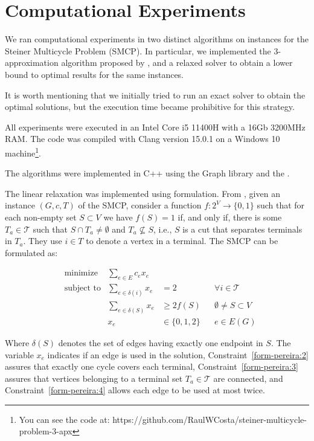 \chapter{Computational Experiments}
\label{chapter:experiments}

We ran computational experiments in two distinct algorithms on instances for the Steiner Multicycle Problem (SMCP). In particular, we implemented the \(3\)-approximation algorithm proposed by \cite{smcp_3apx}, and a relaxed solver to obtain a lower bound to optimal results for the same instances.

It is worth mentioning that we initially tried to run an exact solver to obtain the optimal solutions, but the execution time became prohibitive for this strategy.

All experiments were executed in an Intel Core i5 11400H with a 16Gb 3200MHz RAM. The code was compiled with Clang version 15.0.1 on a Windows 10 machine\footnote{You can see the code at: https://github.com/RaulWCosta/steiner-multicycle-problem-3-apx}.

The algorithms were implemented in C++ using the Graph library \cite{lemon} and the \cite{gurobi}.

The linear relaxation was implemented using \cite{Pereira2018TheSM} formulation. From \citeauthor{Pereira2018TheSM}, given an instance \((G, c, T)\) of the SMCP, consider a function \(f: 2^V \rightarrow \{0, 1\}\) such that for each non-empty set \(S \subset V\) we have \(f(S) = 1\) if, and only if, there is some \(T_a \in \mathcal{T}\) such that \(S \cap T_a \neq \emptyset\) and \(T_a \nsubseteq S\), i.e., \(S\) is a cut that separates terminals in \(T_a\). They use \(i \in T\) to denote a vertex in a terminal. The SMCP can be formulated as:

\begin{align}
&\text{minimize} &\sum_{e\in E} c_e x_e \label{form-pereira:1}\\
&\text{subject to} &\sum_{e \in \delta(i)} x_e &= 2 &&\text{\(\forall i \in \mathcal{T}\)} \label{form-pereira:2}\\ 
&&\sum_{e \in \delta(S)} x_e &\geq 2 f(S) &&\text{\(\emptyset \neq S \subset V\)} \label{form-pereira:3}\\ 
&&x_e &\in \{0, 1, 2\} &&\text{$e \in E(G)$} \label{form-pereira:4}
\end{align}

Where \(\delta(S)\) denotes the set of edges having exactly one endpoint in \(S\). The variable \(x_e\) indicates if an edge is used in the solution, Constraint~\eqref{form-pereira:2} assures that exactly one cycle covers each terminal, Constraint~\eqref{form-pereira:3} assures that vertices belonging to a terminal set \(T_a \in \mathcal{T}\) are connected, and Constraint~\eqref{form-pereira:4} allows each edge to be used at most twice.

